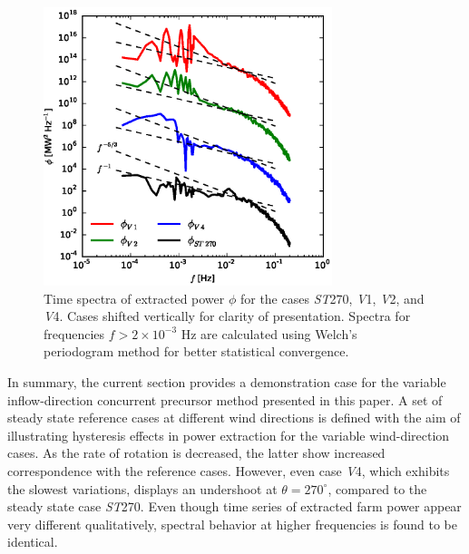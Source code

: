 		\begin{figure}[ht]
			\centering
			\includegraphics[width=0.75\textwidth]{chapters/turbulent_inflow/blm/figure14.eps}
			\caption{Time spectra of extracted power $\phi$ for the cases \emph{ST}270, \emph{V}1, \emph{V}2, and \emph{V}4. Cases shifted vertically for clarity of presentation. Spectra for frequencies $f > 2 \times 10^{-3}$ Hz are calculated using Welch's periodogram method for better statistical convergence. }
			\label{fig:spectra_power}
		\end{figure}
		
		
		In summary, the current section provides a demonstration case for the variable inflow-direction concurrent precursor method presented in this paper. A set of steady state reference cases at different wind directions is defined with the aim of illustrating hysteresis effects in power extraction for the variable wind-direction cases. As the rate of rotation is decreased, the latter show increased correspondence with the reference cases. However, even case \emph{V}4, which exhibits the slowest variations, displays an undershoot at $\theta = 270^\circ$, compared to the steady state case \emph{ST}270. Even though time series of extracted farm power appear very different qualitatively, spectral behavior at higher frequencies is found to be identical.
		
		
